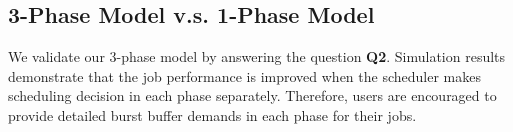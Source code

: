 \subsection{3-Phase Model v.s. 1-Phase Model}
We validate our 3-phase model by answering the question \textbf{Q2}.
Simulation results demonstrate that the job performance is improved 
when the scheduler makes scheduling decision in each phase separately.
Therefore, users are encouraged to provide detailed burst buffer demands in each phase for their jobs.


